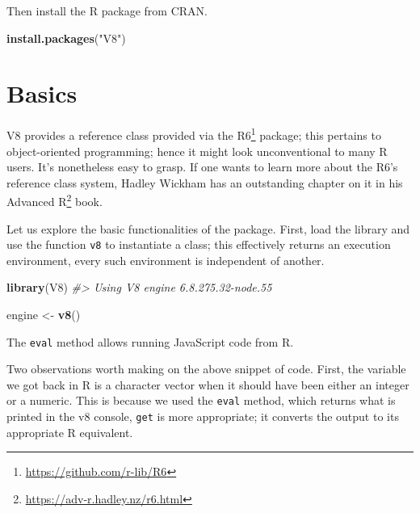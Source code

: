 \documentclass[
]{krantz}
\makeatletter
\newenvironment{Shaded}{\begin{snugshade}}{\end{snugshade}}
\newcommand{\CommentTok}[1]{\textcolor[rgb]{0.37,0.37,0.37}{\textit{#1}}}
\newcommand{\KeywordTok}[1]{\textcolor[rgb]{0.27,0.27,0.27}{\textbf{#1}}}
\newcommand{\NormalTok}[1]{#1}
\newcommand{\OperatorTok}[1]{\textcolor[rgb]{0.43,0.43,0.43}{\textbf{#1}}}
\newcommand{\StringTok}[1]{\textcolor[rgb]{0.5,0.5,0.5}{#1}}
\renewcommand{\href}[2]{#2\footnote{\url{#1}}}
\newenvironment{kframe}{%
\medskip{}
\setlength{\fboxsep}{.8em}
 \def\at@end@of@kframe{}%
 \ifinner\ifhmode%
  \def\at@end@of@kframe{\end{minipage}}%
  \begin{minipage}{\columnwidth}%
 \fi\fi%
 \def\FrameCommand##1{\hskip\@totalleftmargin \hskip-\fboxsep
 \colorbox{shadecolor}{##1}\hskip-\fboxsep
     \hskip-\linewidth \hskip-\@totalleftmargin \hskip\columnwidth}%
 \MakeFramed {\advance\hsize-\width
   \@totalleftmargin\z@ \linewidth\hsize
   \@setminipage}}%
 {\par\unskip\endMakeFramed%
 \at@end@of@kframe}
\renewenvironment{Shaded}{\begin{kframe}}{\end{kframe}}
\makeatother
\begin{document}
Then install the R package from CRAN.

\begin{Shaded}
\begin{Highlighting}[]
\KeywordTok{install.packages}\NormalTok{(}\StringTok{"V8"}\NormalTok{)}
\end{Highlighting}
\end{Shaded}

\hypertarget{v8-basics}{%
\section{Basics}\label{v8-basics}}

V8 provides a reference class provided via the \href{https://github.com/r-lib/R6}{R6} \citep{R-R6} package; this pertains to object-oriented programming; hence it might look unconventional to many R users. It's nonetheless easy to grasp. If one wants to learn more about the R6's reference class system, Hadley Wickham has an outstanding chapter on it in his \href{https://adv-r.hadley.nz/r6.html}{Advanced R} book.

Let us explore the basic functionalities of the package. First, load the library and use the function \texttt{v8} to instantiate a class; this effectively returns an execution environment, every such environment is independent of another.

\begin{Shaded}
\begin{Highlighting}[]
\KeywordTok{library}\NormalTok{(V8)}
\CommentTok{\#> Using V8 engine 6.8.275.32{-}node.55}

\NormalTok{engine <{-}}\StringTok{ }\KeywordTok{v8}\NormalTok{()}
\end{Highlighting}
\end{Shaded}

The \texttt{eval} method allows running JavaScript code from R.

\begin{Shaded}
\end{Shaded}

Two observations worth making on the above snippet of code. First, the variable we got back in R is a character vector when it should have been either an integer or a numeric. This is because we used the \texttt{eval} method, which returns what is printed in the v8 console, \texttt{get} is more appropriate; it converts the output to its appropriate R equivalent.
\end{document}
